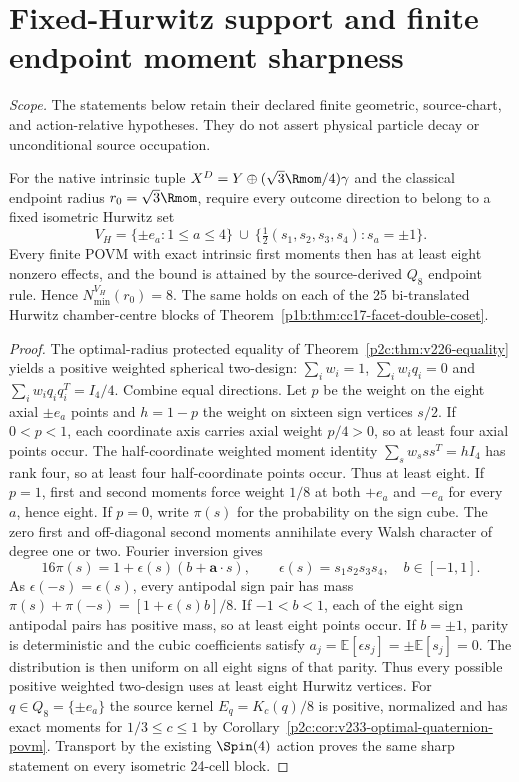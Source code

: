 \documentclass[12pt,a4paper]{article}
\begin{document}
\printbibliography


\section{Fixed-Hurwitz support and finite endpoint moment sharpness}
\noindent\emph{Scope.} The statements below retain their declared finite geometric, source-chart, and action-relative hypotheses. They do not assert physical particle decay or unconditional source occupation.
\begin{theorem}
\label{p2c:thm:v368-hurwitz-endpoint-eight}
For the native intrinsic tuple
$X^D=Y\oplus (\sqrt3\Rmom/4)\gamma$ and the classical endpoint
radius $r_0=\sqrt3\Rmom$, require every outcome direction to belong
to a fixed isometric Hurwitz set
\[
V_H=\{\pm e_a:1\le a\le4\}\ \cup\
\{\tfrac12(s_1,s_2,s_3,s_4):s_a=\pm1\}.
\]
Every finite POVM with exact intrinsic first moments then has at least
eight nonzero effects, and the bound is attained by the source-derived
$Q_8$ endpoint rule. Hence $N_{\min}^{V_H}(r_0)=8$. The same holds
on each of the 25 bi-translated Hurwitz chamber-centre blocks of
Theorem~\ref{p1b:thm:cc17-facet-double-coset}.
\end{theorem}
\begin{proof}
The optimal-radius protected equality of
Theorem~\ref{p2c:thm:v226-equality} yields a positive weighted
spherical two-design: $\sum_iw_i=1$, $\sum_iw_iq_i=0$ and
$\sum_iw_iq_iq_i^T=I_4/4$. Combine equal directions.
Let $p$ be the weight on the eight axial $\pm e_a$ points and
$h=1-p$ the weight on sixteen sign vertices $s/2$.
If $0<p<1$, each coordinate axis carries axial weight $p/4>0$,
so at least four axial points occur. The half-coordinate weighted
moment identity $\sum_s w_s ss^T=hI_4$ has rank four, so at least
four half-coordinate points occur. Thus at least eight.
If $p=1$, first and second moments force weight $1/8$ at
both $+e_a$ and $-e_a$ for every $a$, hence eight.
If $p=0$, write $\pi(s)$ for the probability on the sign cube.
The zero first and off-diagonal second moments annihilate every
Walsh character of degree one or two. Fourier inversion gives
\[
16\pi(s)=1+\epsilon(s)(b+\mathbf a\cdot s),\qquad
\epsilon(s)=s_1s_2s_3s_4,\quad b\in[-1,1].
\]
As $\epsilon(-s)=\epsilon(s)$, every antipodal sign pair has mass
$\pi(s)+\pi(-s)=[1+\epsilon(s)b]/8$. If $-1<b<1$, each of the
eight sign antipodal pairs has positive mass, so at least eight
points occur. If $b=\pm1$, parity is deterministic and the cubic
coefficients satisfy
$a_j=\mathbb E[\epsilon s_j]=\pm\mathbb E[s_j]=0$.
The distribution is then uniform on all eight signs of that parity.
Thus every possible positive weighted two-design uses at least eight
Hurwitz vertices.
For $q\in Q_8=\{\pm e_a\}$ the source kernel
$E_q=K_c(q)/8$ is positive, normalized and has exact moments for
$1/3\le c\le1$ by
Corollary~\ref{p2c:cor:v233-optimal-quaternion-povm}.
Transport by the existing $\Spin(4)$ action proves the same sharp
statement on every isometric 24-cell block.
\end{proof}
\end{document}
